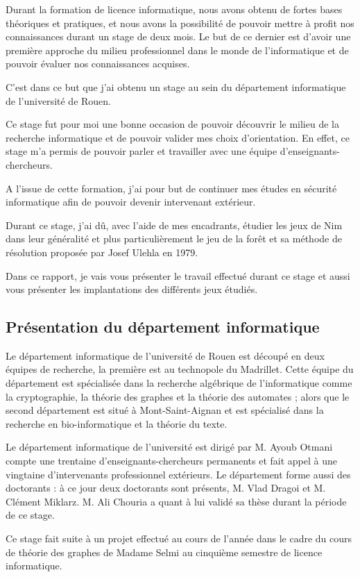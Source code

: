 Durant la formation de licence informatique, nous avons obtenu de fortes bases théoriques et pratiques, et nous avons la possibilité de pouvoir mettre à profit nos connaissances durant un stage de deux mois. Le but de ce dernier est d'avoir une première approche du milieu professionnel dans le monde de l'informatique et de pouvoir évaluer nos connaissances acquises.

C'est dans ce but que j'ai obtenu un stage au sein du département informatique de l’université de Rouen.

Ce stage fut pour moi une bonne occasion de pouvoir découvrir le milieu de la recherche informatique et de pouvoir valider mes choix d'orientation. En effet, ce stage m'a permis de pouvoir parler et travailler avec une équipe d'enseignants-chercheurs.

A l'issue de cette formation, j'ai pour but de continuer mes études en sécurité informatique afin de pouvoir devenir intervenant extérieur.

Durant ce stage, j'ai dû, avec l'aide de mes encadrants, étudier les jeux de Nim dans leur généralité et plus particulièrement le jeu de la forêt et sa méthode de résolution proposée par Josef Ulehla en 1979.

Dans ce rapport, je vais vous présenter le travail effectué durant ce stage et aussi vous présenter les implantations des différents jeux étudiés.

\subsection{Présentation du département informatique}
\label{sub: Présentation du département informatique}

Le département informatique de l’université de Rouen est découpé en deux équipes de recherche, la première est au technopole du Madrillet. Cette équipe du département est spécialisée dans la recherche algébrique de l'informatique comme la cryptographie, la théorie des graphes et la théorie des automates ; alors que le second département est situé à Mont-Saint-Aignan et est spécialisé dans la recherche en bio-informatique et la théorie du texte.

Le département informatique de l’université est dirigé par M. Ayoub Otmani compte une trentaine d'enseignants-chercheurs permanents et fait appel à une vingtaine d'intervenants professionnel extérieurs. Le département forme aussi des doctorants : à ce jour deux doctorants sont présents, M. Vlad Dragoi et M. Clément Miklarz. M. Ali Chouria a quant à lui validé sa thèse durant la période de ce stage.

Ce stage fait suite à un projet effectué au cours de l’année dans le cadre du cours de théorie des graphes de Madame Selmi au cinquième semestre de licence informatique.
